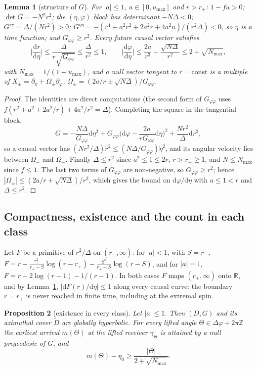 \documentclass[aip,jmp,amsmath,amssymb,reprint]{revtex4-2}
\newcommand{\dd}{\mathrm{d}}
\theoremstyle{plain}
\newtheorem{proposition}{Proposition}[section]
\newtheorem{lemma}[proposition]{Lemma}
\theoremstyle{definition}
\begin{document}
\begin{lemma}[structure of $G$]\label{lem:kerr-G}
For $|a|\le1$, $u\in[0,u_{\max}]$ and $r>r_+$: $1-fu>0$; $\det G=-N^2r^2$; the $(\eta,\varphi)$ block has
determinant $-N\Delta<0$; $G^{rr}=\Delta/(Nr^2)>0$;
$G^{\eta\eta}=-(r^4+a^2r^2+2a^2r+4a^2u)/(r^2\Delta)<0$, so $\eta$ is a time function; and
$G_{\varphi\varphi}\ge r^2$. Every future causal vector satisfies
\[
  \Big|\frac{\dd r}{\dd\eta}\Big|\le\frac{\Delta}{r\sqrt{G_{\varphi\varphi}}}\le\frac\Delta{r^2}\le1,\qquad
  \Big|\frac{\dd\varphi}{\dd\eta}\Big|\le\frac{2a}{r^3}+\frac{\sqrt{N\Delta}}{r^2}\le2+\sqrt{N_{\max}},
\]
with $N_{\max}=1/(1-u_{\max})$, and a null vector tangent to $r=\mathrm{const}$ is a multiple of
$X_\pm=\partial_\eta+\Omega_\pm\partial_\varphi$, $\Omega_\pm=(2a/r\pm\sqrt{N\Delta})/G_{\varphi\varphi}$.
\end{lemma}

\begin{proof}
The identities are direct computations (the second form of $G_{\varphi\varphi}$ uses
$f(r^2+a^2+2a^2/r)+4a^2/r^2=\Delta$). Completing the square in the tangential block,
\[
  G=-\frac{N\Delta}{G_{\varphi\varphi}}\dd\eta^2+G_{\varphi\varphi}\Big(\dd\varphi-\frac{2a}{rG_{\varphi\varphi}}\dd\eta\Big)^2+\frac{Nr^2}\Delta\dd r^2,
\]
so a causal vector has $(Nr^2/\Delta)\dot r^2\le(N\Delta/G_{\varphi\varphi})\dot\eta^2$, and its angular velocity lies
between $\Omega_-$ and $\Omega_+$. Finally $\Delta\le r^2$ since $a^2\le1\le2r$, $r>r_+\ge1$, and
$N\le N_{\max}$ since $f\le1$. The last two terms of $G_{\varphi\varphi}$ are non-negative, so $G_{\varphi\varphi}\ge r^2$;
hence $|\Omega_\pm|\le(2a/r+\sqrt{N\Delta})/r^2$, which gives the bound on $\dd\varphi/\dd\eta$ with $a\le1<r$ and
$\Delta\le r^2$.
\end{proof}

\subsection{Compactness, existence and the count in each class}

Let $F$ be a primitive of $r^2/\Delta$ on $(r_+,\infty)$: for $|a|<1$, with $S=r_-$,
$F=r+\frac{r_+^2}{r_+-S}\log(r-r_+)-\frac{S^2}{r_+-S}\log(r-S)$, and for $|a|=1$,
$F=r+2\log(r-1)-1/(r-1)$. In both cases $F$ maps $(r_+,\infty)$ onto $\mathbb R$, and by
Lemma~\ref{lem:kerr-G}, $|\dd F(r)/\dd\eta|\le1$ along every causal curve: the boundary $r=r_+$ is never
reached in finite time, including at the extremal spin.

\begin{proposition}[existence in every class]\label{prop:kerr-exist}
Let $|a|\le1$. Then $(D,G)$ and its azimuthal cover $\tilde D$ are globally hyperbolic. For every lifted
angle $\Theta\in\Delta\varphi+2\pi\mathbb Z$ the earliest arrival $m(\Theta)$ at the lifted receiver $\gamma_\Theta$ is
attained by a null pregeodesic of $G$, and
\[
  m(\Theta)-\eta_0\ge\frac{|\Theta|}{2+\sqrt{N_{\max}}} .
\]
\end{proposition}
\end{document}
